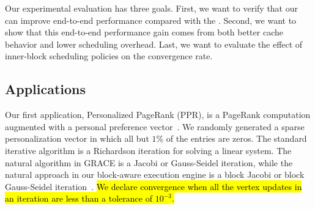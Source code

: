 %

Our experimental evaluation has three goals. 
First, we want to verify that our {\BlkModel} can improve
end-to-end performance compared with the {\VtxModel}.
Second, we want to show that this end-to-end performance gain comes
from both better cache behavior and lower scheduling overhead.
Last, we want to evaluate the effect of inner-block scheduling policies
on the convergence rate.






\subsection{Applications}
Our first application, Personalized PageRank (PPR), is 
a PageRank computation
augmented with a personal preference
vector~\cite{Jeh:2003:SPW}. We randomly generated a sparse
personalization vector
in which all but $1\%$ of the entries are zeros.
%
The standard iterative algorithm
%
is a Richardson iteration for solving a linear system. 
%
The natural algorithm in GRACE is a Jacobi or Gauss-Seidel iteration,
while the natural approach in our block-aware execution engine is a
block Jacobi or block Gauss-Seidel
iteration~\cite{GolubL96:MatrixComp,Barrett:1994:TSL}.
\hl{%
We declare convergence when all the vertex updates in an iteration
are less than a tolerance of $10^{-3}$.
}

